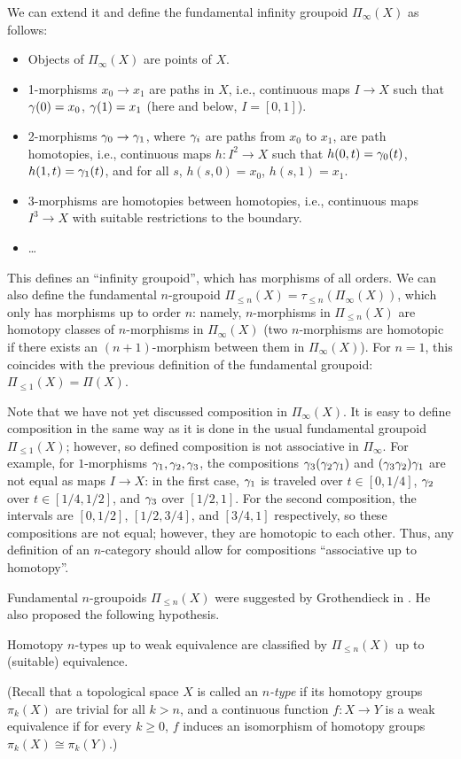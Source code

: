 We can extend it and define the fundamental infinity groupoid $\Pi_{\infty}(X)$
as follows:
\begin{itemize}
  \item Objects of $\Pi_{\infty}(X)$ are points of $X$.
  \item 1-morphisms $x_0\to x_1$ are paths in $X$, i.e., continuous maps
    $I\to X$ such that $\gamma(0)=x_0$, $\gamma(1)=x_1$ (here and below, $I=[0,1]$).
  \item 2-morphisms $\gamma_0\to \gamma_1$, where $\gamma_i$ are paths from $x_0$ to
  $x_1$, are path homotopies, i.e., continuous maps $h\colon I^2\to X$ such that
  $h(0,t)=\gamma_0(t)$, $h(1, t)=\gamma_1(t)$, and for all $s$, $h(s,0)=x_0$,
  $h(s,1)=x_1$.
  \item 3-morphisms are homotopies between homotopies, i.e., continuous maps
  $I^3\to X$ with suitable restrictions to the boundary.
  \item \dots
\end{itemize}
This defines an ``infinity groupoid'', which has morphisms of all orders. We can
also define the fundamental $n$-groupoid $\Pi_{\leq n}(X)=\tau_{\leq
n}(\Pi_\infty(X))$, which only has morphisms up to order $n$: namely,
$n$-morphisms in $\Pi_{\leq n}(X)$ are homotopy classes of
$n$-morphisms in $\Pi_{\infty}(X)$ (two $n$-morphisms are homotopic if there
exists an $(n+1)$-morphism between them in $\Pi_\infty(X)$). For $n=1$, this
coincides with the previous definition of the fundamental groupoid:
$\Pi_{\le 1}(X)=\Pi(X)$.

Note that we have not yet discussed composition in $\Pi_\infty(X)$. It is easy
to define composition in the same way as it is done in the usual fundamental
groupoid $\Pi_{\le 1}(X)$; however, so defined composition is not associative in
$\Pi_\infty$. For example, for $1$-morphisms $\gamma_1, \gamma_2, \gamma_3$, the
compositions $\gamma_3 (\gamma_2 \gamma_1)$ and $(\gamma_3 \gamma_2)\gamma_1$ are not equal as
maps $I\to X$: in the first case, $\gamma_1$ is traveled over $t\in [0, 1/4]$,
$\gamma_2$ over $t\in [1/4, 1/2]$, and $\gamma_3$ over $[1/2,1]$. For the second
composition, the intervals are $[0, 1/2]$, $[1/2, 3/4]$, and $[3/4,1]$
respectively, so these compositions are not equal; however, they are homotopic
to each other. Thus, any definition of an $n$-category should allow for
compositions ``associative up to homotopy''.

Fundamental $n$-groupoids $\Pi_{\leq n}(X)$ were suggested by Grothendieck in
. He also proposed the following hypothesis.
\begin{conjecture}
  Homotopy $n$-types up to weak equivalence
  are classified by $\Pi_{\leq n}(X)$ up to (suitable) equivalence.
\end{conjecture}
(Recall that a topological space $X$ is called an \emph{$n$-type} if its
homotopy groups $\pi_k(X)$ are trivial for all $k>n$, and a continuous function
$f\colon X\to Y$ is a weak equivalence if for every $k\ge 0$, $f$ induces an
isomorphism of homotopy groups $\pi_k(X)\cong \pi_k(Y)$.)

